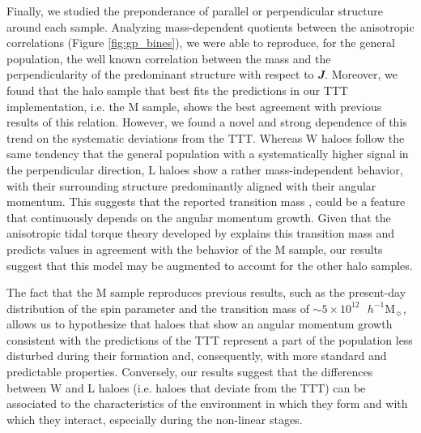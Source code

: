 \documentclass[fleqn,usenatbib]{mnras}
\newcommand{\hMsun}{{\textrm{ $h^{-1}$M$_{\sun}$}}}
\newcommand{\Wh}{\mathrm{W}}
\newcommand{\Lh}{\mathrm{L}}
\newcommand{\Mh}{\mathrm{M}}
\begin{document}
Finally, we studied the preponderance of parallel or perpendicular structure around each sample. Analyzing mass-dependent quotients between the anisotropic correlations (Figure \ref{fig:gp_bines}), we were able to reproduce, for the general population, the well known correlation between the mass and the perpendicularity of the predominant structure with respect to $\mathbfit{J}$. Moreover, we found that the halo sample that best fits the predictions in our TTT implementation, i.e. the $\Mh$ sample, shows the best agreement with previous results of this relation. 
However, we found a novel and strong dependence of this trend on the systematic deviations from the TTT. Whereas $\Wh$ haloes follow the same tendency that the general population with a systematically higher signal in the perpendicular direction, $\Lh$ haloes show a rather mass-independent behavior, with their surrounding structure predominantly aligned with their angular momentum. 
This suggests that the reported transition mass \citep{aragoncalvoetal2007,pazetal2008,codisetal2015}, could be a feature that continuously depends on the angular momentum growth. Given that the anisotropic tidal torque theory developed by \citet{codisetal2015} explains this transition mass and predicts values in agreement with the behavior of the $\Mh$ sample, our results suggest that this model may be augmented to account for the other halo samples.

The fact that the $\Mh$ sample reproduces previous results, such as the present-day distribution of the spin parameter and the transition mass of $\sim 5\times10^{12}\hMsun$, allows us to hypothesize that haloes that show an angular momentum growth consistent with the predictions of the TTT represent a part of the population less disturbed during their formation and, consequently, with more standard and predictable properties.
Conversely, our results suggest that the differences between $\Wh$ and $\Lh$ haloes (i.e. haloes that deviate from the TTT) can be associated to the characteristics of the environment in which they form and with which they interact, especially during the non-linear stages. 
\end{document}
